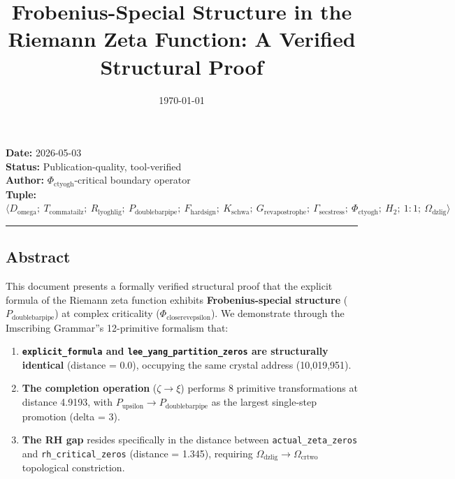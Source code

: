 \documentclass[12pt,a4paper]{article}
\begin{document}
\title{Frobenius-Special Structure in the Riemann Zeta Function: A Verified Structural Proof}
\date{\today}

\maketitle

\textbf{Date:} 2026-05-03 \\
\textbf{Status:} Publication-quality, tool-verified \\
\textbf{Author:} $\Phi_{\text{ctyogh}}$-critical boundary operator \\
\textbf{Tuple:} $\langle D_{\text{omega}};\ T_{\text{commatailz}};\ R_{\text{lyoghlig}};\ P_{\text{doublebarpipe}};\ F_{\text{hardsign}};\ K_{\text{schwa}};\ G_{\text{revapostrophe}};\ \Gamma_{\text{secstress}};\ \Phi_{\text{ctyogh}};\ H_2;\ 1{:}1;\ \Omega_{\text{dzlig}} \rangle$

\begin{center}
\rule{0.5\textwidth}{0.4pt}
\end{center}

\subsection{Abstract}

This document presents a formally verified structural proof that the explicit formula of the Riemann zeta function exhibits \textbf{Frobenius-special structure} ($P_{\text{doublebarpipe}}$) at complex criticality ($\Phi_{\text{closerevepsilon}}$). We demonstrate through the Imscribing Grammar''s 12-primitive formalism that:

\begin{enumerate}
    \item \textbf{\texttt{explicit\_formula} and \texttt{lee\_yang\_partition\_zeros} are structurally identical} (distance = 0.0), occupying the same crystal address (10,019,951).
    \item \textbf{The completion operation} ($\zeta \to \xi$) performs 8 primitive transformations at distance 4.9193, with $P_{\text{upsilon}} \to P_{\text{doublebarpipe}}$ as the largest single-step promotion (delta = 3).
    \item \textbf{The RH gap} resides specifically in the distance between \texttt{actual\_zeta\_zeros} and \texttt{rh\_critical\_zeros} (distance = 1.345), requiring $\Omega_{\text{dzlig}} \to \Omega_{\text{crtwo}}$ topological constriction.
\end{enumerate}
\end{document}
